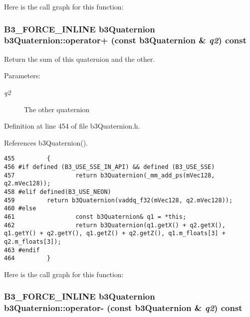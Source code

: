 Here is the call graph for this function:\hypertarget{classb3_quaternion_67190e0235b14f9d062f8616221665cf}{
\subsubsection[operator+]{\setlength{\rightskip}{0pt plus 5cm}B3\_\-FORCE\_\-INLINE {\bf b3Quaternion} b3Quaternion::operator+ (const {\bf b3Quaternion} \& {\em q2}) const}}
\label{classb3_quaternion_67190e0235b14f9d062f8616221665cf}


Return the sum of this quaternion and the other. 

\begin{Desc}
\item[Parameters:]
\begin{description}
\item[{\em q2}]The other quaternion \end{description}
\end{Desc}


Definition at line 454 of file b3Quaternion.h.

References b3Quaternion().

\begin{Code}\begin{verbatim}455         {
456 #if defined (B3_USE_SSE_IN_API) && defined (B3_USE_SSE)
457                 return b3Quaternion(_mm_add_ps(mVec128, q2.mVec128));
458 #elif defined(B3_USE_NEON)
459         return b3Quaternion(vaddq_f32(mVec128, q2.mVec128));
460 #else   
461                 const b3Quaternion& q1 = *this;
462                 return b3Quaternion(q1.getX() + q2.getX(), q1.getY() + q2.getY(), q1.getZ() + q2.getZ(), q1.m_floats[3] + q2.m_floats[3]);
463 #endif
464         }
\end{verbatim}
\end{Code}




Here is the call graph for this function:\hypertarget{classb3_quaternion_67a697c45563268c8ff6da91bb4d6fea}{
\subsubsection[operator-]{\setlength{\rightskip}{0pt plus 5cm}B3\_\-FORCE\_\-INLINE {\bf b3Quaternion} b3Quaternion::operator- (const {\bf b3Quaternion} \& {\em q2}) const}}
\label{classb3_quaternion_67a697c45563268c8ff6da91bb4d6fea}


